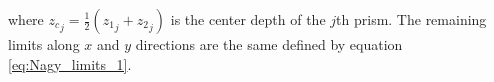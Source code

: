 \documentclass[P]{BrJG_submit}
\begin{document}
where ${z_c}_{j} = \frac{1}{2}({z_1}_{j} + {z_2}_{j})$ is the center depth of the $j$th prism. 
The remaining limits along $x$ and $y$ directions are the same defined by equation \ref{eq:Nagy_limits_1}.

\vspace{0.5cm}
\end{document}

